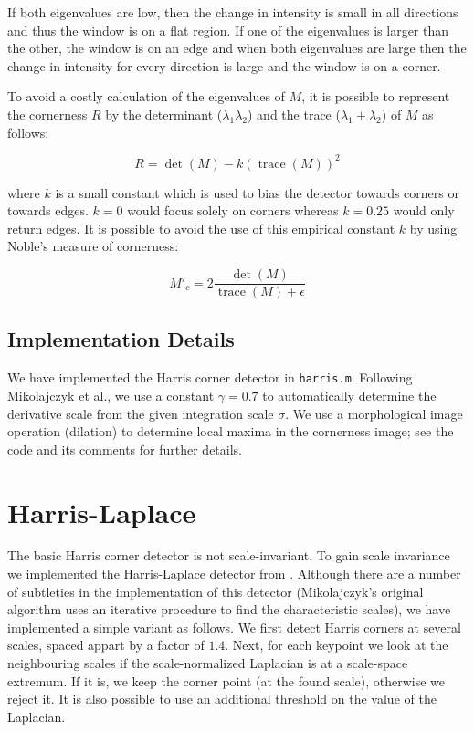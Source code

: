 \documentclass[a4paper,10pt]{article}
\begin{document}
If both eigenvalues are low, then the change in intensity is small in all directions and thus the window is on a flat region. If one of the eigenvalues is larger than the other, the window is on an edge and when both eigenvalues are large then the change in intensity for every direction is large and the window is on a corner.

To avoid a costly calculation of the eigenvalues of $M$, it is possible to represent the cornerness $R$ by the determinant ($\lambda_1 \lambda_2$) and the trace ($\lambda_1 + \lambda_2$) of $M$ as follows:

\[R = \det( M ) - k(\operatorname{trace}( M ))^2\]

where $k$ is a small constant which is used to bias the detector towards corners or towards edges.
$k=0$ would focus solely on corners whereas $k=0.25$ would only return edges.
It is possible to avoid the use of this empirical constant $k$ by using Noble's measure of cornerness\cite{noble1989descriptions}:

\[M'_c = 2 \frac{\det( M )}{\operatorname{trace}( M ) + \epsilon}\]

\subsection{Implementation Details}
We have implemented the Harris corner detector in \verb+harris.m+.
Following Mikolajczyk et al.\cite{Mikolajczyk2004}, we use a constant $\gamma = 0.7$ to automatically determine the derivative scale from the given integration scale $\sigma$.
We use a morphological image operation (dilation) to determine local maxima in the cornerness image; see the code and its comments for further details.

\section{Harris-Laplace}
The basic Harris corner detector is not scale-invariant.
To gain scale invariance we implemented the Harris-Laplace detector from \cite{Mikolajczyk2004}.
Although there are a number of subtleties in the implementation of this detector (Mikolajczyk's original algorithm uses an iterative procedure to find the characteristic scales), we have implemented a simple variant as follows.
We first detect Harris corners at several scales, spaced appart by a factor of $1.4$.
Next, for each keypoint we look at the neighbouring scales if the scale-normalized Laplacian is at a scale-space extremum.
If it is, we keep the corner point (at the found scale), otherwise we reject it.
It is also possible to use an additional threshold on the value of the Laplacian.
\end{document}
